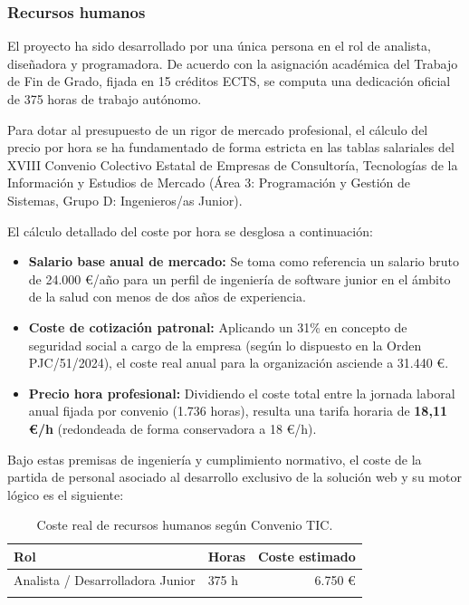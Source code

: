 \subsubsection{Recursos humanos}
El proyecto ha sido desarrollado por una única persona en el rol de analista, diseñadora y programadora. De acuerdo con la asignación académica del Trabajo de Fin de Grado, fijada en 15 créditos ECTS, se computa una dedicación oficial de 375 horas de trabajo autónomo.

Para dotar al presupuesto de un rigor de mercado profesional, el cálculo del precio por hora se ha fundamentado de forma estricta en las tablas salariales del XVIII Convenio Colectivo Estatal de Empresas de Consultoría, Tecnologías de la Información y Estudios de Mercado (Área 3: Programación y Gestión de Sistemas, Grupo D: Ingenieros/as Junior).  \cite{boe:conveniotic}

El cálculo detallado del coste por hora se desglosa a continuación:
\begin{itemize}
    \item \textbf{Salario base anual de mercado:} Se toma como referencia un salario bruto de 24.000 €/año para un perfil de ingeniería de software junior en el ámbito de la salud con menos de dos años de experiencia.
    \item \textbf{Coste de cotización patronal:} Aplicando un 31\% en concepto de seguridad social a cargo de la empresa (según lo dispuesto en la Orden PJC/51/2024), el coste real anual para la organización asciende a 31.440 €.
    \item \textbf{Precio hora profesional:} Dividiendo el coste total entre la jornada laboral anual fijada por convenio (1.736 horas), resulta una tarifa horaria de \textbf{18,11 €/h} (redondeada de forma conservadora a 18 €/h).
\end{itemize}

Bajo estas premisas de ingeniería y cumplimiento normativo, el coste de la partida de personal asociado al desarrollo exclusivo de la solución web y su motor lógico es el siguiente:

\begin{table}[!h]
    \centering
    \begin{tabular}{ l p{4cm} r }
        \toprule
        \textbf{Rol} & \textbf{Horas} & \textbf{Coste estimado} \\
        \midrule
        \addlinespace
        Analista / Desarrolladora Junior & 375 h & 6.750 € \\
        \addlinespace
        \bottomrule
    \end{tabular}
    \caption{Coste real de recursos humanos según Convenio TIC.}
\end{table}
\FloatBarrier

